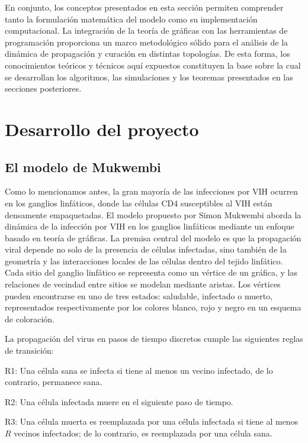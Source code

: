 \documentclass[12pt,titlepage,twoside,openright]{book}
\begin{document}
En conjunto, los conceptos presentados en esta secci\'on permiten comprender tanto la formulaci\'on matem\'atica del modelo como su implementaci\'on computacional. La integraci\'on de la teor\'ia de gr\'aficas con las herramientas de programaci\'on proporciona un marco metodol\'ogico s\'olido para el an\'alisis de la din\'amica de propagaci\'on y curaci\'on en distintas topolog\'ias. De esta forma, los conocimientos te\'oricos y t\'ecnicos aqu\'i expuestos constituyen la base sobre la cual se desarrollan los algoritmos, las simulaciones y los teoremas presentados en las secciones posteriores.


\chapter{Desarrollo del proyecto}

\section{El modelo de Mukwembi}
Como lo mencionamos antes, la gran mayor\'ia de las infecciones por VIH ocurren en los ganglios linf\'aticos, donde las c\'elulas CD4 susceptibles al VIH est\'an densamente empaquetadas. El modelo propuesto por Simon Mukwembi \cite{Mukwembi} aborda la din\'amica de la infecci\'on por VIH en los ganglios linf\'aticos mediante un enfoque basado en teor\'ia de gr\'aficas. La premisa central del modelo es que la propagaci\'on viral depende no solo de la presencia de c\'elulas infectadas, sino tambi\'en de la geometr\'ia y las interacciones locales de las c\'elulas dentro del tejido linf\'atico. Cada sitio del ganglio linf\'atico se representa como un v\'ertice de un gr\'afica, y las relaciones de vecindad entre sitios se modelan mediante aristas. Los v\'ertices pueden encontrarse en uno de tres estados: saludable, infectado o muerto, representados respectivamente por los colores blanco, rojo y negro en un esquema de coloraci\'on.

La propagaci\'on del virus en pasos de tiempo discretos cumple las siguientes reglas de transici\'on:

R1: Una c\'elula sana se infecta si tiene al menos un vecino infectado, de lo contrario, permanece sana.

R2: Una c\'elula infectada muere en el siguiente paso de tiempo.

R3: Una c\'elula muerta es reemplazada por una c\'elula infectada si tiene al menos $R$ vecinos infectados; de lo contrario, es reemplazada por una c\'elula sana.
\end{document}
